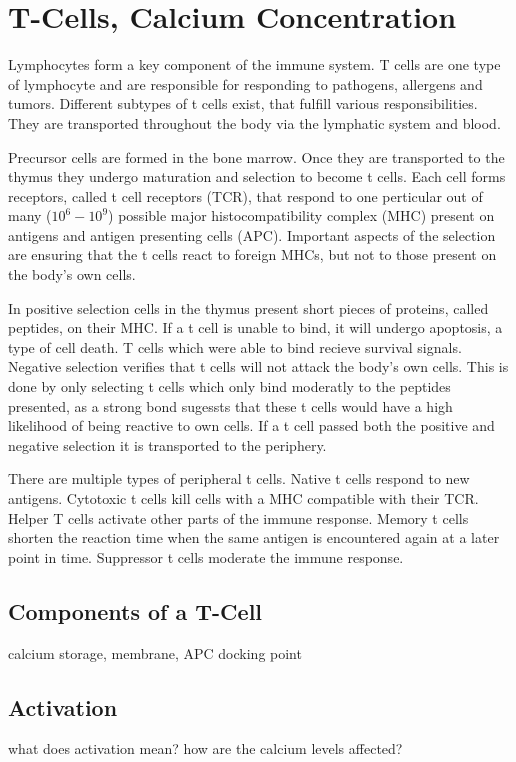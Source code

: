 \chapter{T-Cells, Calcium Concentration}
\label{chapter:t-cell}

Lymphocytes form a key component of the immune system. T cells are one type of lymphocyte and are responsible for responding to pathogens, allergens and tumors. Different subtypes of t cells exist, that fulfill various responsibilities. They are transported throughout the body via the lymphatic system and blood.\cite{Kumar2018}

Precursor cells are formed in the bone marrow. Once they are transported to the thymus they undergo maturation and selection to become t cells. Each cell forms receptors, called t cell receptors (TCR), that respond to one perticular out of many ($10^6 - 10^9$) possible major histocompatibility complex (MHC) present on antigens and antigen presenting cells (APC). Important aspects of the selection are ensuring that the t cells react to foreign MHCs, but not to those present on the body's own cells.\cite{Ashby2024}

In positive selection cells in the thymus present short pieces of proteins, called peptides, on their MHC. If a t cell is unable to bind, it will undergo apoptosis, a type of cell death. T cells which were able to bind recieve survival signals. Negative selection verifies that t cells will not attack the body's own cells. This is done by only selecting t cells which only bind moderatly to the peptides presented, as a strong bond sugessts that these t cells would have a high likelihood of being reactive to own cells.\cite{Hagel2018} If a t cell passed both the positive and negative selection it is transported to the periphery.

There are multiple types of peripheral t cells. Native t cells respond to new antigens. Cytotoxic t cells kill cells with a MHC compatible with their TCR. Helper T cells activate other parts of the immune response. Memory t cells shorten the reaction time when the same antigen is encountered again at a later point in time. Suppressor t cells moderate the immune response.\cite{Ganong1997}

\section{Components of a T-Cell}

calcium storage, membrane, APC docking point

\section{Activation}

what does activation mean? how are the calcium levels affected?

